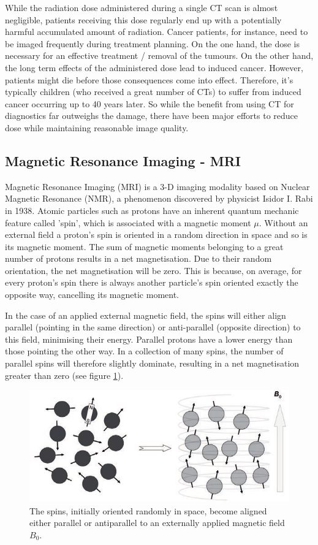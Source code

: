While the radiation dose administered during a single CT scan is almost negligible, patients receiving this dose regularly end up with a potentially harmful accumulated amount of radiation.
Cancer patients, for instance, need to be imaged frequently during treatment planning.
On the one hand, the dose is necessary for an effective treatment / removal of the tumours.
On the other hand, the long term effects of the administered dose lead to induced cancer.
However, patients might die before those consequences come into effect.
Therefore, it's typically children (who received a great number of CTs) to suffer from induced cancer occurring up to 40 years later.
So while the benefit from using CT for diagnostics far outweighs the damage, there have been major efforts to reduce dose while maintaining reasonable image quality.
\cite{Murphy2007, Brenner2001, Sodickson2009, Smith2007, McCollough2009, Goldman2013}


\subsection{Magnetic Resonance Imaging - MRI}
\label{sec:MRI}
Magnetic Resonance Imaging (MRI) is a 3-D imaging modality based on Nuclear Magnetic Resonance (NMR), a phenomenon discovered by physicist Isidor I. Rabi in 1938.
Atomic particles such as protons have an inherent quantum mechanic feature called 'spin', which is associated with a magnetic moment $\mu$.
Without an external field a proton's spin is oriented in a random direction in space and so is its magnetic moment.
The sum of magnetic moments belonging to a great number of protons results in a net magnetisation.
Due to their random orientation, the net magnetisation will be zero.
This is because, on average, for every proton's spin there is always another particle's spin oriented exactly the opposite way, cancelling its magnetic moment.

In the case of an applied external magnetic field, the spins will either align parallel (pointing in the same direction) or anti-parallel (opposite direction) to this field, minimising their energy.
Parallel protons have a lower energy than those pointing the other way.
In a collection of many spins, the number of parallel spins will therefore slightly dominate, resulting in a net magnetisation greater than zero (see figure \ref{fig:spin_align}).

\begin{figure}[h!]
\centering
\includegraphics[width=0.8\linewidth]{../fig/intro/spin_align}
\caption{The spins, initially oriented randomly in space, become aligned either parallel or antiparallel to an externally applied magnetic field $B_0$. \cite{Maidment2014}}
\label{fig:spin_align}
\end{figure}

